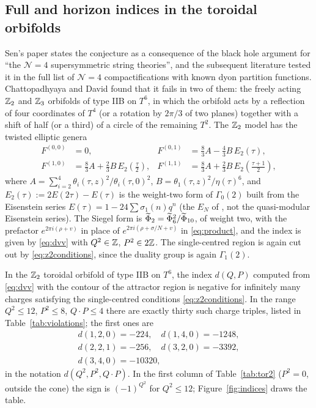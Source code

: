 \subsection{Full and horizon indices in the toroidal orbifolds}\label{ssec:toroidal}

Sen's paper states the conjecture as a consequence of the black hole argument for ``the $\mathcal N=4$ supersymmetric string theories'', and the subsequent literature \cite{CD19,CKMRW20} tested it in the full list of $\mathcal N=4$ compactifications with known dyon partition functions. Chattopadhyaya and David \cite{CD19} found that it fails in two of them: the freely acting $\mathbb{Z}_2$ and $\mathbb{Z}_3$ orbifolds of type IIB on $T^6$, in which the orbifold acts by a reflection of four coordinates of $T^4$ (or a rotation by $2\pi/3$ of two planes) together with a shift of half (or a third) of a circle of the remaining $T^2$. The $\mathbb{Z}_2$ model has the twisted elliptic genera
\begin{equation}\label{eq:tor2genera}
\begin{aligned}
F^{(0,0)} &= 0,& F^{(0,1)} &= \tfrac83 A - \tfrac43 B\,E_2(\tau),\\
F^{(1,0)} &= \tfrac83 A + \tfrac23 B\,E_2(\tfrac\tau2),& F^{(1,1)} &= \tfrac83 A + \tfrac23 B\,E_2(\tfrac{\tau+1}2),
\end{aligned}
\end{equation}
where $A = \sum_{i=2}^4\theta_i(\tau,z)^2/\theta_i(\tau,0)^2$, $B = \theta_1(\tau,z)^2/\eta(\tau)^6$, and $E_2(\tau) := 2E(2\tau) - E(\tau)$ is the weight-two form of $\Gamma_0(2)$ built from the Eisenstein series $E(\tau) = 1 - 24\sum\sigma_1(n)q^n$ (the $E_N$ of \cite{DJS06}, not the quasi-modular Eisenstein series). The Siegel form is $\widetilde{\Phi}_2 = \widetilde{\Phi}_6^2/\widetilde{\Phi}_{10}$, of weight two, with the prefactor $e^{2\pi i(\rho+v)}$ in place of $e^{2\pi i(\rho+\sigma/N+v)}$ in \eqref{eq:product}, and the index is given by \eqref{eq:dvv} with $Q^2\in\mathbb{Z}$, $P^2\in 2\mathbb{Z}$. The single-centred region is again cut out by \eqref{eq:z2conditions}, since the duality group is again $\Gamma_1(2)$.

\begin{theorem}\label{thm:positivityfails}
In the $\mathbb{Z}_2$ toroidal orbifold of type IIB on $T^6$, the index $d(Q,P)$ computed from \eqref{eq:dvv} with the contour of the attractor region is negative for infinitely many charges satisfying the single-centred conditions \eqref{eq:z2conditions}. In the range $Q^2\le 12$, $P^2\le 8$, $Q\cdot P\le 4$ there are exactly thirty such charge triples, listed in Table~\ref{tab:violations}; the first ones are
\begin{gather*}
d(1,2,0) = -224,\quad d(1,4,0) = -1248,\\
d(2,2,1) = -256,\quad d(3,2,0) = -3392,\\
d(3,4,0) = -10320,
\end{gather*}
in the notation $d(Q^2,P^2,Q\cdot P)$. In the first column of Table~\ref{tab:tor2} ($P^2=0$, outside the cone) the sign is $(-1)^{Q^2}$ for $Q^2\le 12$; Figure~\ref{fig:indices} draws the table.
\end{theorem}

